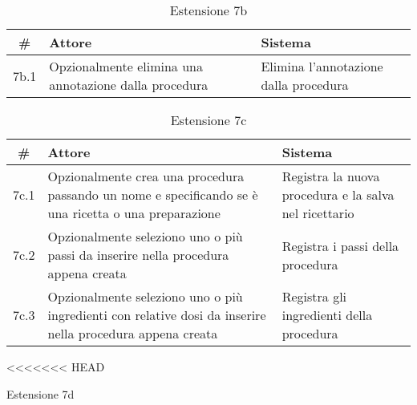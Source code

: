 \begin{table}[H]\centering\caption*{Estensione 7b}
      \small
      \begin{tabular}{|c|p{7cm}|p{6.24cm}|}
            \hline\bfseries \# & \bfseries Attore                                      & \bfseries Sistema                     \\\hline
            7b.1               & Opzionalmente elimina una annotazione dalla procedura & Elimina l’annotazione dalla procedura \\\hline
      \end{tabular}
\end{table}

\begin{table}[H]\centering\caption*{Estensione 7c}
      \small
      \begin{tabular}{|c|p{7cm}|p{6.24cm}|}
            \hline\bfseries \# & \bfseries Attore                                                                                          & \bfseries Sistema                                     \\\hline
            7c.1               & Opzionalmente crea una procedura passando un nome e specificando se è una ricetta o una preparazione      & Registra la nuova procedura e la salva nel ricettario \\\hline
            7c.2               & Opzionalmente seleziono uno o più passi da inserire nella procedura appena creata                         & Registra i passi della procedura                      \\\hline
            7c.3               & Opzionalmente seleziono uno o più ingredienti con relative dosi da inserire nella procedura appena creata & Registra gli ingredienti della procedura              \\\hline
      \end{tabular}
\end{table}

<<<<<<< HEAD
\begin{table}[H]\centering\caption*{Estensione 7d}
\end{table}


